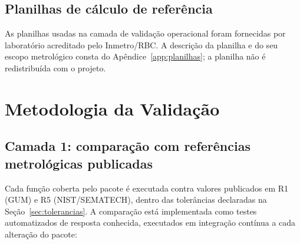 \documentclass[11pt,a4paper]{article}
\begin{document}
\subsection{Planilhas de cálculo de referência}

As planilhas usadas na camada de validação operacional foram fornecidas por laboratório acreditado pelo Inmetro/RBC. A descrição da planilha e do seu escopo metrológico consta do Apêndice~\ref{app:planilhas}; a planilha não é redistribuída com o projeto.

\section{Metodologia da Validação}
\label{sec:metodologia}

\subsection{Camada 1: comparação com referências metrológicas publicadas}

Cada função coberta pelo pacote é executada contra valores publicados em R1 (GUM) e R5 (NIST/SEMATECH), dentro das tolerâncias declaradas na Seção~\ref{sec:tolerancias}. A comparação está implementada como testes automatizados de resposta conhecida, executados em integração contínua a cada alteração do pacote:
\end{document}
